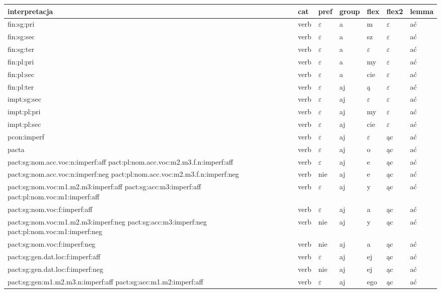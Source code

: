 \documentclass{article}
\begin{document}
\begin{longtable}{p{7cm}|l|l|l|l|l|l}
interpretacja & cat & pref & group & flex & flex2 & lemma\\
\hline
fin:sg:pri & verb & $\varepsilon$ & a & m & $\varepsilon$ & ać\\
fin:sg:sec & verb & $\varepsilon$ & a & sz & $\varepsilon$ & ać\\
fin:sg:ter & verb & $\varepsilon$ & a & $\varepsilon$ & $\varepsilon$ & ać\\
fin:pl:pri & verb & $\varepsilon$ & a & my & $\varepsilon$ & ać\\
fin:pl:sec & verb & $\varepsilon$ & a & cie & $\varepsilon$ & ać\\
fin:pl:ter & verb & $\varepsilon$ & aj & ą & $\varepsilon$ & ać\\
impt:sg:sec & verb & $\varepsilon$ & aj & $\varepsilon$ & $\varepsilon$ & ać\\
impt:pl:pri & verb & $\varepsilon$ & aj & my & $\varepsilon$ & ać\\
impt:pl:sec & verb & $\varepsilon$ & aj & cie & $\varepsilon$ & ać\\
pcon:imperf & verb & $\varepsilon$ & aj & $\varepsilon$ & ąc & ać\\
pacta & verb & $\varepsilon$ & aj & o & ąc & ać\\
pact:sg:nom.acc.voc:n:imperf:aff pact:pl:nom.acc.voc:m2.m3.f.n:imperf:aff & verb & $\varepsilon$ & aj & e & ąc & ać\\
pact:sg:nom.acc.voc:n:imperf:neg pact:pl:nom.acc.voc:m2.m3.f.n:imperf:neg & verb & nie & aj & e & ąc & ać\\
pact:sg:nom.voc:m1.m2.m3:imperf:aff pact:sg:acc:m3:imperf:aff pact:pl:nom.voc:m1:imperf:aff & verb & $\varepsilon$ & aj & y & ąc & ać\\
pact:sg:nom.voc:f:imperf:aff & verb & $\varepsilon$ & aj & a & ąc & ać\\
pact:sg:nom.voc:m1.m2.m3:imperf:neg pact:sg:acc:m3:imperf:neg pact:pl:nom.voc:m1:imperf:neg & verb & nie & aj & y & ąc & ać\\
pact:sg:nom.voc:f:imperf:neg & verb & nie & aj & a & ąc & ać\\
pact:sg:gen.dat.loc:f:imperf:aff & verb & $\varepsilon$ & aj & ej & ąc & ać\\
pact:sg:gen.dat.loc:f:imperf:neg & verb & nie & aj & ej & ąc & ać\\
pact:sg:gen:m1.m2.m3.n:imperf:aff pact:sg:acc:m1.m2:imperf:aff & verb & $\varepsilon$ & aj & ego & ąc & ać\\

\end{longtable}
\end{document}
